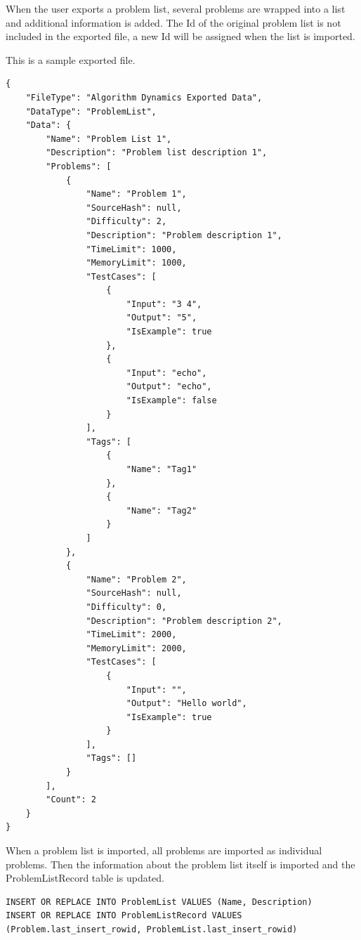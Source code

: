 \documentclass[a4paper]{report}
\begin{document}
When the user exports a problem list, several problems are wrapped into a list and additional information is added. The Id of the original problem list is not included in the exported file, a new Id will be assigned when the list is imported.

This is a sample exported file.

\begin{verbatim}
{
    "FileType": "Algorithm Dynamics Exported Data",
    "DataType": "ProblemList",
    "Data": {
        "Name": "Problem List 1",
        "Description": "Problem list description 1",
        "Problems": [
            {
                "Name": "Problem 1",
                "SourceHash": null,
                "Difficulty": 2,
                "Description": "Problem description 1",
                "TimeLimit": 1000,
                "MemoryLimit": 1000,
                "TestCases": [
                    {
                        "Input": "3 4",
                        "Output": "5",
                        "IsExample": true
                    },
                    {
                        "Input": "echo",
                        "Output": "echo",
                        "IsExample": false
                    }
                ],
                "Tags": [
                    {
                        "Name": "Tag1"
                    },
                    {
                        "Name": "Tag2"
                    }
                ]
            },
            {
                "Name": "Problem 2",
                "SourceHash": null,
                "Difficulty": 0,
                "Description": "Problem description 2",
                "TimeLimit": 2000,
                "MemoryLimit": 2000,
                "TestCases": [
                    {
                        "Input": "",
                        "Output": "Hello world",
                        "IsExample": true
                    }
                ],
                "Tags": []
            }
        ],
        "Count": 2
    }
}
\end{verbatim}

When a problem list is imported, all problems are imported as individual problems. Then the information about the problem list itself is imported and the ProblemListRecord table is updated.

\begin{verbatim}
INSERT OR REPLACE INTO ProblemList VALUES (Name, Description)
INSERT OR REPLACE INTO ProblemListRecord VALUES (Problem.last_insert_rowid, ProblemList.last_insert_rowid)
\end{verbatim}
\end{document}
